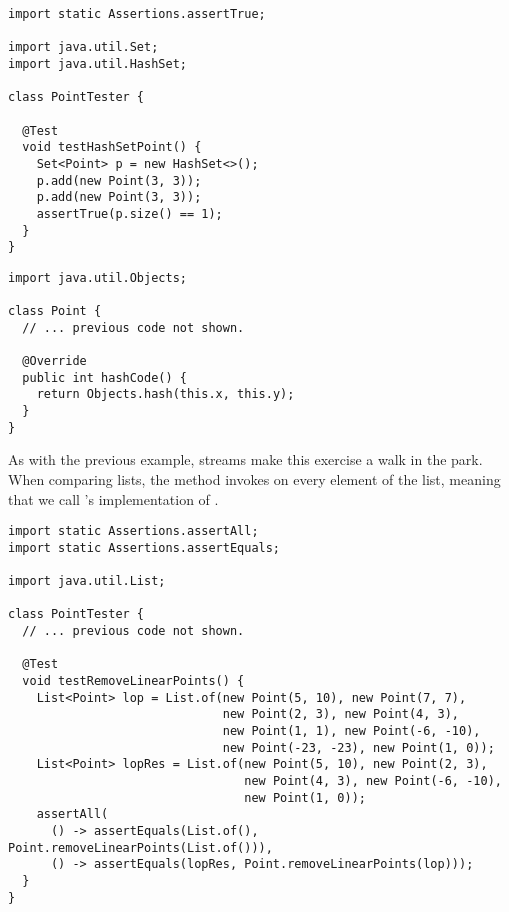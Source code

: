 \begin{lstlisting}[language=MyJava]
import static Assertions.assertTrue;

import java.util.Set;
import java.util.HashSet;

class PointTester {

  @Test
  void testHashSetPoint() {
    Set<Point> p = new HashSet<>();
    p.add(new Point(3, 3));
    p.add(new Point(3, 3));
    assertTrue(p.size() == 1);
  }
}
\end{lstlisting}

\begin{lstlisting}[language=MyJava]
import java.util.Objects;

class Point {
  // ... previous code not shown.

  @Override
  public int hashCode() {
    return Objects.hash(this.x, this.y);
  }
}
\end{lstlisting}

As with the previous example, streams make this exercise a walk in the park. 
When comparing lists, the  method invokes  on every element of the list, meaning that we call 's implementation of .

\begin{lstlisting}[language=MyJava]
import static Assertions.assertAll;
import static Assertions.assertEquals;

import java.util.List;

class PointTester {
  // ... previous code not shown. 

  @Test
  void testRemoveLinearPoints() {
    List<Point> lop = List.of(new Point(5, 10), new Point(7, 7),
                              new Point(2, 3), new Point(4, 3),
                              new Point(1, 1), new Point(-6, -10),
                              new Point(-23, -23), new Point(1, 0));
    List<Point> lopRes = List.of(new Point(5, 10), new Point(2, 3),
                                 new Point(4, 3), new Point(-6, -10),
                                 new Point(1, 0));
    assertAll(
      () -> assertEquals(List.of(), Point.removeLinearPoints(List.of())),
      () -> assertEquals(lopRes, Point.removeLinearPoints(lop)));
  }
}
\end{lstlisting}

